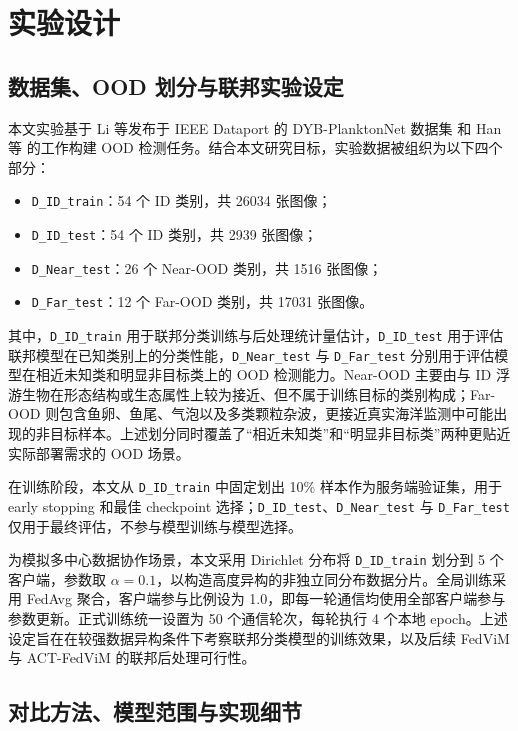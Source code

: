 
\chapter{实验设计}

\section{数据集、OOD 划分与联邦实验设定}

本文实验基于 Li 等发布于 IEEE Dataport 的 DYB-PlanktonNet 数据集\cite{li2021dybplanktonnet} 和 Han 等\cite{han2025benchmarking} 的工作构建 OOD 检测任务。结合本文研究目标，实验数据被组织为以下四个部分：
\begin{itemize}
  \item \texttt{D\_ID\_train}：54 个 ID 类别，共 26034 张图像；
  \item \texttt{D\_ID\_test}：54 个 ID 类别，共 2939 张图像；
  \item \texttt{D\_Near\_test}：26 个 Near-OOD 类别，共 1516 张图像；
  \item \texttt{D\_Far\_test}：12 个 Far-OOD 类别，共 17031 张图像。
\end{itemize}

其中，\texttt{D\_ID\_train} 用于联邦分类训练与后处理统计量估计，\texttt{D\_ID\_test} 用于评估联邦模型在已知类别上的分类性能，\texttt{D\_Near\_test} 与 \texttt{D\_Far\_test} 分别用于评估模型在相近未知类和明显非目标类上的 OOD 检测能力。Near-OOD 主要由与 ID 浮游生物在形态结构或生态属性上较为接近、但不属于训练目标的类别构成；Far-OOD 则包含鱼卵、鱼尾、气泡以及多类颗粒杂波，更接近真实海洋监测中可能出现的非目标样本。上述划分同时覆盖了“相近未知类”和“明显非目标类”两种更贴近实际部署需求的 OOD 场景。

在训练阶段，本文从 \texttt{D\_ID\_train} 中固定划出 10\% 样本作为服务端验证集，用于 early stopping 和最佳 checkpoint 选择；\texttt{D\_ID\_test}、\texttt{D\_Near\_test} 与 \texttt{D\_Far\_test} 仅用于最终评估，不参与模型训练与模型选择。

为模拟多中心数据协作场景，本文采用 Dirichlet 分布将 \texttt{D\_ID\_train} 划分到 5 个客户端，参数取 $\alpha = 0.1$，以构造高度异构的非独立同分布数据分片。全局训练采用 FedAvg 聚合，客户端参与比例设为 1.0，即每一轮通信均使用全部客户端参与参数更新。正式训练统一设置为 50 个通信轮次，每轮执行 4 个本地 epoch。上述设定旨在在较强数据异构条件下考察联邦分类模型的训练效果，以及后续 FedViM 与 ACT-FedViM 的联邦后处理可行性。

\section{对比方法、模型范围与实现细节}

